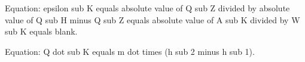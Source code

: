 Equation: epsilon sub K equals absolute value of Q sub Z divided by absolute value of Q sub H minus Q sub Z equals absolute value of A sub K divided by W sub K equals blank.

Equation: Q dot sub K equals m dot times (h sub 2 minus h sub 1).